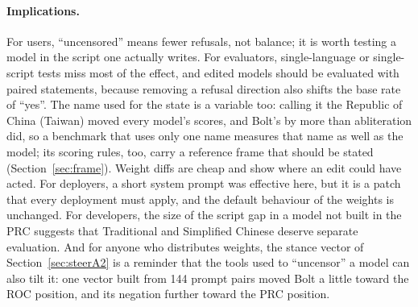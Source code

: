 \documentclass[11pt,a4paper]{article}
\begin{document}
\paragraph{Implications.}
For users, ``uncensored'' means fewer refusals, not balance; it is worth testing a model in the script one actually
writes. For evaluators, single-language or single-script tests miss most of the effect, and edited models should be
evaluated with paired statements, because removing a refusal direction also shifts the base rate of ``yes''. The name
used for the state is a variable too: calling it the Republic of China (Taiwan) moved every model's scores, and Bolt's
by more than abliteration did, so a benchmark that uses only one name measures that name as well as the model; its
scoring rules, too, carry a reference frame that should be stated (Section~\ref{sec:frame}). Weight
diffs are cheap and show where an edit could have acted. For deployers, a short system prompt was
effective here, but it is a patch that every deployment must apply, and the default behaviour of the weights is
unchanged. For developers, the size of the script gap in a model not built in the PRC suggests that Traditional and
Simplified Chinese deserve separate evaluation. And for anyone who distributes weights, the stance vector of
Section~\ref{sec:steerA2} is a reminder that the tools used to ``uncensor'' a model can also tilt it: one vector built
from 144 prompt pairs moved Bolt a little toward the ROC position, and its negation further toward the PRC position.
\end{document}
